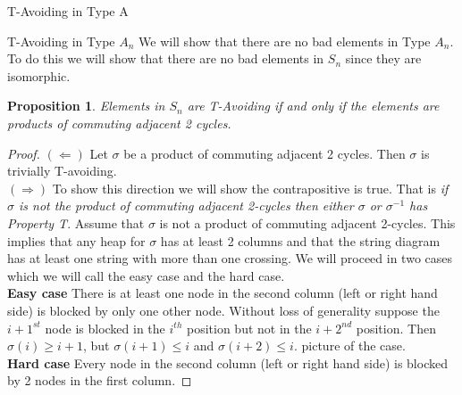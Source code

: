\documentclass[11pt]{amsart}
\newtheorem{proposition}[theorem]{Proposition}
\theoremstyle{definition}
\numberwithin{equation}{section}
\renewcommand{\(}{\left(}
\renewcommand{\)}{\right)}
\begin{document}
\begin{section}{T-Avoiding in Type A}
\begin{subsection}{T-Avoiding in Type \textbf{$A_n$}}
We will show that there are no bad elements in Type $A_n$. To do this we will show that there are no bad elements in $S_n$ since they are isomorphic.
\begin{proposition}
Elements in $S_n$ are T-Avoiding if and only if the elements are products of commuting adjacent 2 cycles.
\end{proposition}
\begin{proof}
$(\Leftarrow)$ Let $\sigma$ be a product of commuting adjacent 2 cycles. Then $\sigma$ is trivially T-avoiding.\\
$(\Rightarrow)$ To show this direction we will show the contrapositive is true. That is \emph{if $\sigma$ is not the product of commuting adjacent 2-cycles then either $\sigma$ or $\sigma^{-1}$ has Property T}. Assume that $\sigma$ is not a product of commuting adjacent 2-cycles. This implies that any heap for $\sigma$ has at least 2 columns and that the string diagram has at least one string with more than one crossing. We will proceed in two cases which we will call the easy case and the hard case. \\
\textbf{Easy case} There is at least one node in the second column (left or right hand side) is blocked by only one other node. Without loss of generality suppose the $i+1^{st}$ node is blocked in the $i^{th}$ position but not in the $i+2^{nd}$ position. Then $\sigma(i) \geq i+1$, but $\sigma(i+1) \leq i$ and $\sigma(i+2) \leq i$. {\color{red} picture of the case}.\\
\textbf{Hard case} Every node in the second column (left or right hand side) is blocked by 2 nodes in the first column.  
\end{proof}

\end{subsection}
	
\end{section}




\end{document}
